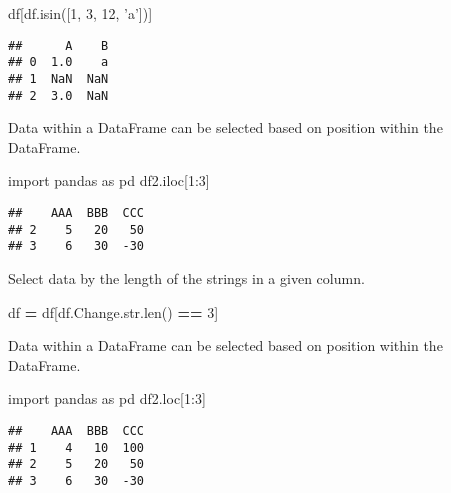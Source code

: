 \documentclass[]{book}
\newenvironment{Shaded}{\begin{snugshade}}{\end{snugshade}}
\newcommand{\BuiltInTok}[1]{#1}
\newcommand{\DecValTok}[1]{\textcolor[rgb]{0.00,0.00,0.81}{#1}}
\newcommand{\ImportTok}[1]{#1}
\newcommand{\NormalTok}[1]{#1}
\newcommand{\OperatorTok}[1]{\textcolor[rgb]{0.81,0.36,0.00}{\textbf{#1}}}
\newcommand{\StringTok}[1]{\textcolor[rgb]{0.31,0.60,0.02}{#1}}
\begin{document}
\begin{Shaded}
\begin{Highlighting}[]
\NormalTok{df[df.isin([}\DecValTok{1}\NormalTok{, }\DecValTok{3}\NormalTok{, }\DecValTok{12}\NormalTok{, }\StringTok{'a'}\NormalTok{])]}
\end{Highlighting}
\end{Shaded}

\begin{verbatim}
##      A    B
## 0  1.0    a
## 1  NaN  NaN
## 2  3.0  NaN
\end{verbatim}

Data within a DataFrame can be selected based on position within the DataFrame.

\begin{Shaded}
\begin{Highlighting}[]
\ImportTok{import}\NormalTok{ pandas }\ImportTok{as}\NormalTok{ pd}
\NormalTok{df2.iloc[}\DecValTok{1}\NormalTok{:}\DecValTok{3}\NormalTok{]}
\end{Highlighting}
\end{Shaded}

\begin{verbatim}
##    AAA  BBB  CCC
## 2    5   20   50
## 3    6   30  -30
\end{verbatim}

Select data by the length of the strings in a given column.

\begin{Shaded}
\begin{Highlighting}[]
\NormalTok{df }\OperatorTok{=}\NormalTok{ df[df.Change.}\BuiltInTok{str}\NormalTok{.}\BuiltInTok{len}\NormalTok{() }\OperatorTok{==} \DecValTok{3}\NormalTok{]}
\end{Highlighting}
\end{Shaded}

Data within a DataFrame can be selected based on position within the DataFrame.

\begin{Shaded}
\begin{Highlighting}[]
\ImportTok{import}\NormalTok{ pandas }\ImportTok{as}\NormalTok{ pd}
\NormalTok{df2.loc[}\DecValTok{1}\NormalTok{:}\DecValTok{3}\NormalTok{]}
\end{Highlighting}
\end{Shaded}

\begin{verbatim}
##    AAA  BBB  CCC
## 1    4   10  100
## 2    5   20   50
## 3    6   30  -30
\end{verbatim}
\end{document}
